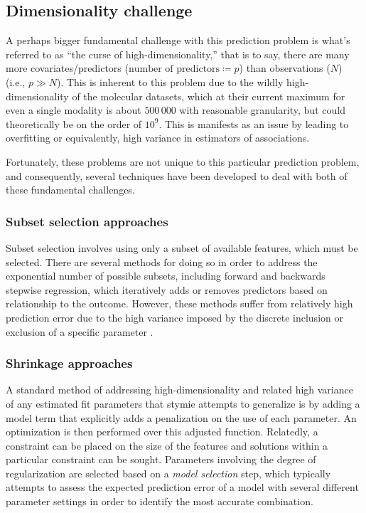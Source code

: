 \subsection{Dimensionality challenge}
A perhaps bigger fundamental challenge with this prediction problem is what’s referred to as “the curse of high-dimensionality,” that is to say, there are many more covariates/predictors ($\text{number of predictors} \coloneqq p $) than observations ($N$) (i.e., $p \gg N$).  This is inherent to this problem due to the wildly high-dimensionality of the molecular datasets, which at their current maximum for even a single modality is about $500\,000$ with reasonable granularity, but could theoretically be on the order of $10^9$. This is manifests as an issue by leading to overfitting or equivalently, high variance in estimators of associations.

Fortunately, these problems are not unique to this particular prediction problem, and consequently, several techniques have been developed to deal with both of these fundamental challenges. 

\subsubsection{Subset selection approaches}

Subset selection involves using only a subset of available features, which must be selected. There are several methods for doing so in order to address the exponential number of possible subsets, including forward and backwards stepwise regression, which iteratively adds or removes predictors based on relationship to the outcome. However, these methods suffer from relatively high prediction error due to the high variance imposed by the discrete inclusion or exclusion of a specific parameter . 

\subsubsection{Shrinkage approaches}

A standard method of addressing high-dimensionality and related high variance of any estimated fit parameters that stymie attempts to generalize is by adding a model term that explicitly adds a penalization on the use of each parameter. An optimization is then performed over this adjusted function. Relatedly, a constraint can be placed on the size of the features and solutions within a particular constraint can be sought. Parameters involving the degree of regularization are selected based on a \textit{model selection} step, which typically attempts to assess the expected prediction error of a model with several different parameter settings in order to identify the most accurate combination. 

